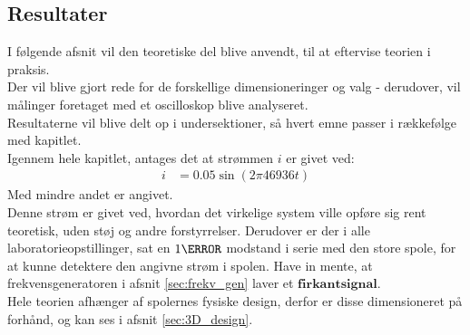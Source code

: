 \subsection{Resultater}
I følgende afsnit vil den teoretiske del blive anvendt, til at eftervise teorien i praksis.\\
Der vil blive gjort rede for de forskellige dimensioneringer og valg - derudover, vil målinger foretaget med et oscilloskop blive analyseret.\\ 
Resultaterne vil blive delt op i undersektioner, så hvert emne passer i rækkefølge med kapitlet.\\
Igennem hele kapitlet, antages det at strømmen $i$ er givet ved:
\begin{align}
	 i&=0.05\sin{(2\pi46936 t)} \nonumber
\end{align}
Med mindre andet er angivet.\\
Denne strøm er givet ved, hvordan det virkelige system ville opføre sig rent teoretisk, uden støj og andre forstyrrelser.
Derudover er der i alle laboratorieopstillinger, sat en $1\ohm$ modstand i serie med den store spole, for at kunne detektere den angivne strøm i spolen.
Have in mente, at frekvensgeneratoren i afsnit \ref{sec:frekv_gen} laver et $\textbf{firkantsignal}$.\\ 
Hele teorien afhænger af spolernes fysiske design, derfor er disse dimensioneret på forhånd, og kan ses i afsnit \ref{sec:3D_design}.

